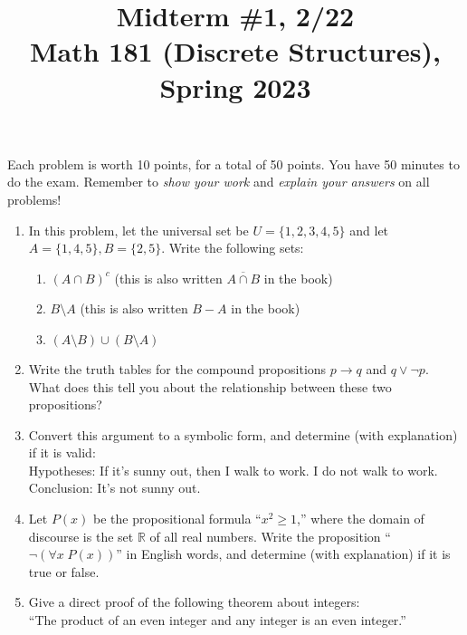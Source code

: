 \documentclass[11pt]{article}
\title{Midterm \#1, 2/22 \\Math 181 (Discrete Structures), Spring 2023}
\date{}
\begin{document}
\maketitle

\thispagestyle{empty}

\vspace{-1cm}

Each problem is worth 10 points, for a total of 50 points. You have 50 minutes to do the exam. Remember to \emph{show your work} and \emph{explain your answers} on all problems! 

\begin{enumerate}
\item In this problem, let the universal set be $U = \{1,2,3,4,5\}$ and let $A=\{1,4,5\}, B=\{2,5\}$. Write the following sets:
\begin{enumerate}
\item $(A\cap B)^c$ \hfill (this is also written $\overline{A\cap B}$ in the book)
\item $B \setminus A$ \hfill (this is also written $B-A$ in the book)
\item $(A \setminus B) \cup (B \setminus A)$
\end{enumerate}
\item Write the truth tables for the compound propositions $p \to q$ and $q \vee \neg p$. What does this tell you about the relationship between these two propositions?
\item Convert this argument to a symbolic form, and determine (with explanation) if it is valid: \\[0.5em]
Hypotheses: If it's sunny out, then I walk to work. I do not walk to work. \\
Conclusion: It's not sunny out.
\item Let $P(x)$ be the propositional formula ``$x^2 \geq 1$,'' where the domain of discourse is the set $\mathbb{R}$ of all real numbers. Write the proposition ``$\neg (\forall x \; P(x))$'' in English words, and determine (with explanation) if it is true or false.
\item Give a direct proof of the following theorem about integers: \\ ``The product of an even integer and any integer is an even integer.''
\end{enumerate}
\end{document}
